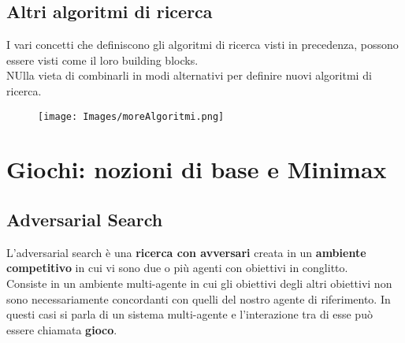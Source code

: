\documentclass{article}
\begin{document}
\subsection{Altri algoritmi di ricerca}
I vari concetti che definiscono gli algoritmi di ricerca visti in precedenza, possono essere visti come il loro building blocks.
\\ NUlla vieta di combinarli in modi alternativi per definire nuovi algoritmi di ricerca.
\begin{figure}[H]
    \centering
    \texttt{[image: Images/moreAlgoritmi.png]}
\end{figure}
\section{Giochi: nozioni di base e Minimax}
\subsection{Adversarial Search}
L'adversarial search è una \textbf{ricerca con avversari} creata in un \textbf{ambiente competitivo} in cui vi sono due o più agenti con obiettivi in conglitto.
\\ Consiste in un ambiente multi-agente in cui gli obiettivi degli altri obiettivi non sono necessariamente concordanti con quelli del nostro agente di riferimento. In questi casi si parla di un sistema
multi-agente e l'interazione tra di esse può essere chiamata \textbf{gioco}.
\end{document}

